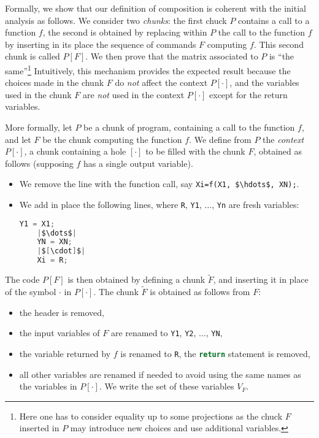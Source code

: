 \documentclass[runningheads]{llncs}
\newcommand{\pr}{\lstinline[mathescape]}
\newcommand{\prc}{\lstinline[language=C]}
\begin{document}
Formally, we show that our definition of composition is coherent with the initial analysis as follows. We consider two \emph{chunks}: the first chuck \(P\) contains a call to a function \(f\), the second is obtained by replacing within \(P\) the call to the function \(f\) by inserting in its place the sequence of commands \(F\) computing \(f\). This second chunk is called \(P[F]\). We then prove that the matrix associated to \(P\) is \enquote{the same}\footnote{Here one has to consider equality up to some projections as the chuck \(F\) inserted in \(P\) may introduce new choices and use additional variables.}
Intuitively, this mechanism provides the expected result because the choices made in the chunk \(F\) do \emph{not} affect the context \(P[\cdot]\), and the variables used in the chunk \(F\) are \emph{not} used in the context \(P[\cdot]\) except for the return variables. %

More formally, let \(P\) be a chunk of program, containing a call to the function \(f\), and let \(F\) be the chunk computing the function \(f\). We define from \(P\) the \emph{context} \(P[\cdot]\), a chunk containing a hole \([\cdot]\) to be filled with the chunk \(F\), obtained as follows (supposing \(f\) has a single output variable).
\begin{itemize}[noitemsep,nolistsep]
	\item We remove the line with the function call, say \pr|Xi=f(X1, $\hdots$, XN);|.
	\item We add in place the following lines, where \pr|R|, \pr|Y1|, \(\hdots\), \pr|Yn| are fresh variables:
	      \begin{lstlisting}[language=C, belowskip=0.1 \baselineskip, aboveskip=0.1 \baselineskip]
	Y1 = X1;
	|$\dots$|
	YN = XN;
	|$[\cdot]$|
	Xi = R;
\end{lstlisting}
\end{itemize}

The code \(P[F]\) is then obtained by defining a chunk \(\tilde{F}\), and inserting it in place of the symbol \(\cdot\) in \(P[\cdot]\). The chunk \(\tilde{F}\) is obtained as follows from \(F\):
\begin{itemize}[nolistsep,noitemsep]
	\item the header is removed,
	\item the input variables of \(F\) are renamed to \pr|Y1|, \pr|Y2|, \(\hdots\), \pr|YN|,
	\item the variable returned by \(f\) is renamed to \pr|R|, the \prc|return| statement is removed,
	\item all other variables are renamed if needed to avoid using the same names as the variables in \(P[\cdot]\). We write the set of these variables \(V_{F}\).
\end{itemize}
\end{document}
